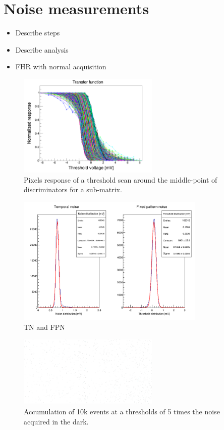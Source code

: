 \section{Noise measurements}

  \begin{itemize} 
    \item Describe steps
    \item Describe analysis
    \item FHR with normal acquisition
  \end{itemize}

  \begin{figure}
    \centering
    \includegraphics[width=0.6\textwidth]{Pictures/labTests/transfer_B.png}
    \caption{Pixels response of a threshold scan around the middle-point of discriminators for a sub-matrix.}
  \end{figure}

  \begin{figure}
    \centering
    \includegraphics[width=0.8\textwidth]{Pictures/labTests/noise_A.png}
    \caption{TN and FPN}
  \end{figure}
  
  \begin{figure}
    \centering
    \includegraphics[width=0.6\textwidth]{Pictures/labTests/8sigma_10kEvents_noSource}
    \caption{Accumulation of 10k events at a thresholds of 5 times the noise acquired in the dark.}
  \end{figure}

